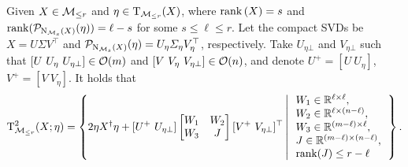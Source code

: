 \begin{proposition}\label{pro:tangenttwo_mr}
    Given $X\in\mathcal{M}_{\le r}$ and $\eta\in\mathrm{T}_{\mathcal{M}_{\le r}}(X)$, where $\operatorname{rank}{(X)}=s$ and $\operatorname{rank}(\mathcal{P}_{\mathrm{N}_{\mathcal{M}_{s}}(X)}(\eta))=\ell-s$ for some $s\le \ell\le r$. Let the compact SVDs be $X=U\varSigma V^\top$ and $\mathcal{P}_{\mathrm{N}_{\mathcal{M}_{s}}(X)}(\eta)=U_{\eta} \varSigma_\eta V_{\eta}^\top$, respectively. Take ${U}_{\eta\bot}$ and ${V}_{\eta\bot}$ such that $[U\ U_\eta\ U_{\eta\bot}]\in\orth(m)$ and $[V\ V_\eta\ V_{\eta\bot}]\in\orth(n)$, and denote $U^+=[U\ U_{\eta}]$, $V^+=[V\ V_{\eta}]$. It holds that
    \begin{equation}\label{eq:tangenttwo_mr}
        \mathrm{T}^2_{\mathcal{M}_{\le r}}(X;\eta)=\left\{ {2\eta X^\dagger\eta + [U^+\ U_{\eta\bot}]\left[ \begin{matrix}
        	W_1&		W_2\\
        	W_3&		J\\
        \end{matrix} \right][V^+\ V_{\eta\bot}]^\top \left|\,\begin{array}{l}
        W_1\in\mathbb{R}^{\ell\times\ell},
        \\
        W_2\in\mathbb{R}^{\ell\times (n-\ell)},
        \\
        W_3\in\mathbb{R}^{(m-\ell)\times \ell},
        \\
        J\in\mathbb{R}^{(m-\ell)\times (n-\ell)},
        \\
        \operatorname{rank}(J)\le r-\ell
        \end{array}\right.
        } \right\}.
    \end{equation}
\end{proposition}

